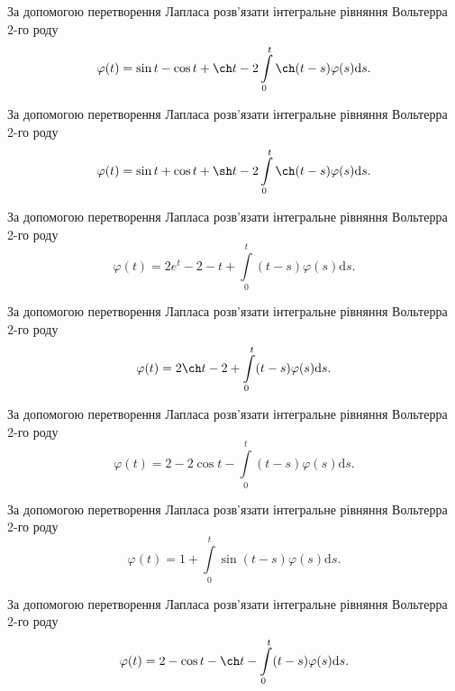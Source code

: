 \documentclass[12pt]{extarticle}
\begin{document}
\begin{Exercise}
За допомогою перетворення Лапласа розв’язати інтегральне рівняння Вольтерра 2-го роду \[\varphi(t) = \sin t - \cos t + \ch t - 2\int\limits_{0}^{t} \ch (t-s) \varphi(s) \mathrm{d}s.\]
\end{Exercise}

\begin{Exercise}
За допомогою перетворення Лапласа розв’язати інтегральне рівняння Вольтерра 2-го роду \[\varphi(t) = \sin t + \cos t + \sh t - 2\int\limits_{0}^{t} \ch (t-s) \varphi(s) \mathrm{d}s.\]
\end{Exercise}

\begin{Exercise}
За допомогою перетворення Лапласа розв’язати інтегральне рівняння Вольтерра 2-го роду \[\varphi(t) = 2 e^t - 2 - t + \int\limits_{0}^{t} (t - s) \varphi(s) \mathrm{d}s.\]
\end{Exercise}

\begin{Exercise}
За допомогою перетворення Лапласа розв’язати інтегральне рівняння Вольтерра 2-го роду \[\varphi(t) = 2 \ch t - 2 + \int\limits_{0}^{t} (t - s) \varphi(s) \mathrm{d}s.\]
\end{Exercise}

\begin{Exercise}
За допомогою перетворення Лапласа розв’язати інтегральне рівняння Вольтерра 2-го роду \[\varphi(t) = 2 - 2\cos t - \int\limits_{0}^{t} (t - s) \varphi(s) \mathrm{d}s.\]
\end{Exercise}

\begin{Exercise}
За допомогою перетворення Лапласа розв’язати інтегральне рівняння Вольтерра 2-го роду \[\varphi(t) = 1 + \int\limits_{0}^{t} \sin (t - s) \varphi(s) \mathrm{d}s.\]
\end{Exercise}

\begin{Exercise}
За допомогою перетворення Лапласа розв’язати інтегральне рівняння Вольтерра 2-го роду \[\varphi(t) = 2 - \cos t - \ch t - \int\limits_{0}^{t} (t - s) \varphi(s) \mathrm{d}s.\]
\end{Exercise}
\end{document}
